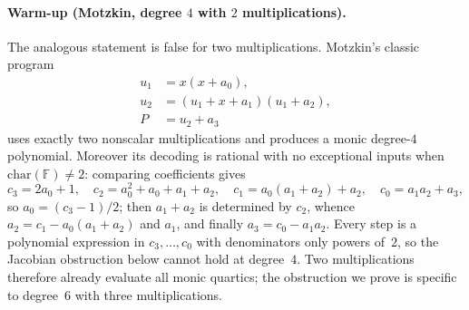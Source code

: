 \paragraph{Warm-up (Motzkin, degree $4$ with $2$ multiplications).}
The analogous statement is false for two multiplications.
Motzkin's classic program
\begin{align}
   u_1 &= x (x + a_0), \\
   u_2 &= (u_1 + x + a_1)(u_1 + a_2), \\
   P &= u_2 + a_3
\end{align}
uses exactly two nonscalar multiplications and produces a monic degree-$4$
polynomial.  Moreover its decoding is rational with no exceptional inputs when
$\mathrm{char}(\mathbb{F})\neq2$: comparing coefficients gives
\[
   c_3=2a_0+1,\quad
   c_2=a_0^2+a_0+a_1+a_2,\quad
   c_1=a_0(a_1+a_2)+a_2,\quad
   c_0=a_1a_2+a_3,
\]
so $a_0=(c_3-1)/2$; then $a_1+a_2$ is determined by $c_2$, whence
$a_2=c_1-a_0(a_1+a_2)$ and $a_1$, and finally $a_3=c_0-a_1a_2$.
Every step is a polynomial expression in $c_3,\dots,c_0$ with denominators
only powers of~$2$, so the Jacobian obstruction below cannot hold at degree~$4$.
Two multiplications therefore already evaluate all monic quartics; the
obstruction we prove is specific to degree~$6$ with three multiplications.

